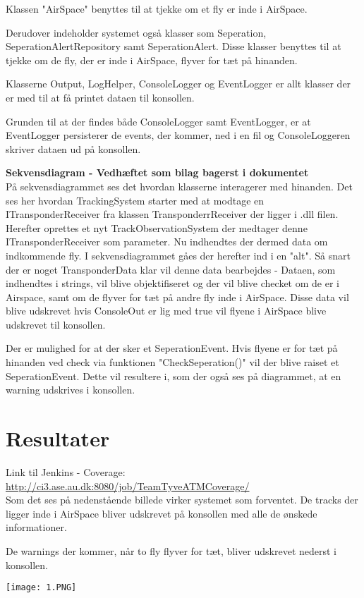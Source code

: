Klassen "AirSpace" benyttes til at tjekke om et fly er inde i AirSpace.

Derudover indeholder systemet også klasser som Seperation, SeperationAlertRepository samt SeperationAlert. Disse klasser benyttes til at tjekke om de fly, der er inde i AirSpace, flyver for tæt på hinanden. 

Klasserne Output, LogHelper, ConsoleLogger og EventLogger er allt klasser der er med til at få printet dataen til konsollen. 

Grunden til at der findes både ConsoleLogger samt EventLogger, er at EventLogger persisterer de events, der kommer, ned i en fil og ConsoleLoggeren skriver dataen ud på konsollen. \newline

\textbf{Sekvensdiagram - Vedhæftet som bilag bagerst i dokumentet} \\
På sekvensdiagrammet ses det hvordan klasserne interagerer med hinanden. \tabularnewline
Det ses her hvordan TrackingSystem starter med at modtage en ITransponderReceiver fra klassen TransponderrReceiver der ligger i .dll filen. \tabularnewline
Herefter oprettes et nyt TrackObservationSystem der medtager denne ITransponderReceiver som parameter.\tabularnewline
Nu indhendtes der dermed data om indkommende fly. I sekvensdiagrammet gåes der herefter ind i en "alt". \tabularnewline
Så snart der er noget TransponderData klar vil denne data bearbejdes - Dataen, som indhendtes i strings, vil blive objektifiseret og der vil blive checket om de er i Airspace, samt om de flyver for tæt på andre fly inde i AirSpace.
Disse data vil blive udskrevet hvis ConsoleOut er lig med true vil flyene i AirSpace blive udskrevet til konsollen.

Der er mulighed for at der sker et SeperationEvent. \tabularnewline
Hvis flyene er for tæt på hinanden ved check via funktionen "CheckSeperation()" vil der blive raiset et SeperationEvent. 
Dette vil resultere i, som der også ses på diagrammet, at en warning udskrives i konsollen.


\section{Resultater}
Link til Jenkins - Coverage: \url{http://ci3.ase.au.dk:8080/job/TeamTyveATMCoverage/} \\
Som det ses på nedenstående billede virker systemet som forventet. De tracks der ligger inde i AirSpace bliver udskrevet på konsollen med alle de ønskede informationer.

De warnings der kommer, når to fly flyver for tæt, bliver udskrevet nederst i konsollen.\newline

\texttt{[image: 1.PNG]}





